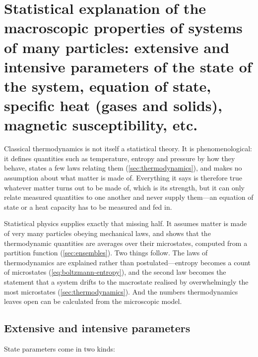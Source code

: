 \section{Statistical explanation of the macroscopic properties of systems of many particles: extensive and intensive parameters of the state of the system, equation of state, specific heat (gases and solids), magnetic susceptibility, etc.}
\label{sec:macroscopic}

    Classical thermodynamics is not itself a statistical theory. It is phenomenological: it defines quantities such as temperature, entropy and pressure by how they behave, states a few laws relating them (\cref{sec:thermodynamics}), and makes no assumption about what matter is made of. Everything it says is therefore true whatever matter turns out to be made of, which is its strength, but it can only relate measured quantities to one another and never supply them---an equation of state or a heat capacity has to be measured and fed in.

    Statistical physics supplies exactly that missing half. It assumes matter is made of very many particles obeying mechanical laws, and shows that the thermodynamic quantities are averages over their microstates, computed from a partition function (\cref{sec:ensembles}). Two things follow. The laws of thermodynamics are explained rather than postulated---entropy becomes a count of microstates (\cref{eq:boltzmann-entropy}), and the second law becomes the statement that a system drifts to the macrostate realised by overwhelmingly the most microstates (\cref{sec:thermodynamics}). And the numbers thermodynamics leaves open can be calculated from the microscopic model.

    \subsection{Extensive and intensive parameters}

        State parameters come in two kinds:

